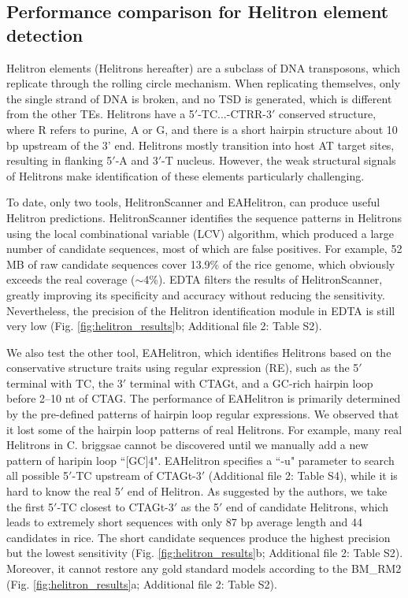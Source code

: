 \documentclass{bmcart}
\begin{document}
\subsection*{Performance comparison for Helitron element detection}
Helitron elements (Helitrons hereafter) are a subclass of DNA transposons, which replicate through the rolling circle mechanism. When replicating themselves, only the single strand of DNA is broken, and no TSD is generated, which is different from the other TEs. Helitrons have a 5$'$-TC...-CTRR-3$'$ conserved structure, where R refers to purine, A or G, and there is a short hairpin structure about 10 bp upstream of the 3' end. Helitrons mostly transition into host AT target sites, resulting in flanking 5$'$-A and 3$'$-T nucleus\cite{kapitonov2007helitrons}. However, the weak structural signals of Helitrons make identification of these elements particularly challenging.

To date, only two tools, HelitronScanner and EAHelitron, can produce useful Helitron predictions. HelitronScanner identifies the sequence patterns in Helitrons using the local combinational variable (LCV) algorithm, which produced a large number of candidate sequences, most of which are false positives. For example, 52 MB of raw candidate sequences cover 13.9\% of the rice genome, which obviously exceeds the real coverage ($\sim$4\%). EDTA filters the results of HelitronScanner, greatly improving its specificity and accuracy without reducing the sensitivity\cite{ou2019benchmarking}. Nevertheless, the precision of the Helitron identification module in EDTA is still very low (Fig. \ref{fig:helitron_results}b; Additional file 2: Table S2).

We also test the other tool, EAHelitron, which identifies Helitrons based on the conservative structure traits using regular expression (RE), such as the 5$'$ terminal with TC, the 3$'$ terminal with CTAGt, and a GC-rich hairpin loop before 2–10 nt of CTAG. The performance of EAHelitron is primarily determined by the pre-defined patterns of hairpin loop regular expressions. We observed that it lost some of the hairpin loop patterns of real Helitrons. For example, many real Helitrons in C. briggsae cannot be discovered until we manually add a new pattern of haripin loop ``[GC]{4}". EAHelitron specifies a ``-u" parameter to search all possible 5$'$-TC upstream of CTAGt-3$'$ (Additional file 2: Table S4), while it is hard to know the real 5$'$ end of Helitron. As suggested by the authors, we take the first 5$'$-TC closest to CTAGt-3$'$ as the 5$'$ end of candidate Helitrons, which leads to extremely short sequences with only 87 bp average length and 44 candidates in rice. The short candidate sequences produce the highest precision but the lowest sensitivity (Fig. \ref{fig:helitron_results}b; Additional file 2: Table S2). Moreover, it cannot restore any gold standard models according to the BM\_RM2 (Fig. \ref{fig:helitron_results}a; Additional file 2: Table S2).
\end{document}
